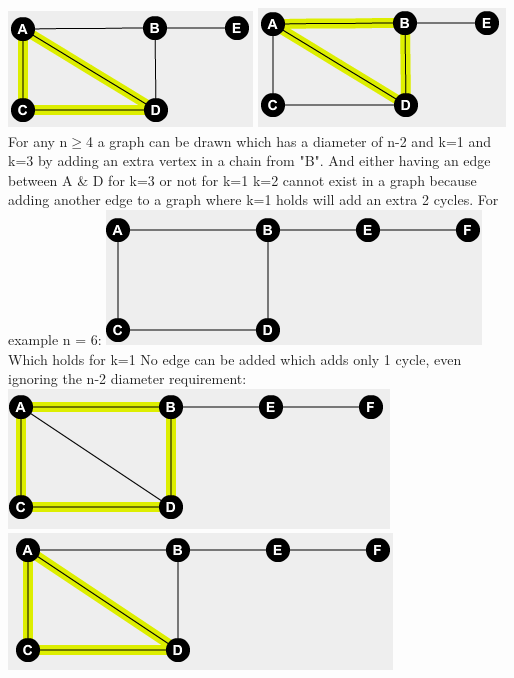 \documentclass{article}
\begin{document}
	\includegraphics{53Cycle2}
	\includegraphics{53Cycle3}
	\newline
	For any n$\geq$4 a graph can be drawn which has a diameter of n-2 and k=1 and k=3 by adding an extra vertex in a chain from "B".
	\newline
	And either having an edge between A \& D for k=3 or not for k=1
	\newline
	k=2 cannot exist in a graph because adding another edge to a graph where k=1 holds will add an extra 2 cycles.
	For example n = 6:
	\newline
	\includegraphics{6None}
	\newline
	Which holds for k=1
	\newline
	No edge can be added which adds only 1 cycle, even ignoring the n-2 diameter requirement:
	\newline
	\includegraphics{6Cycles1}
	\newline
	\includegraphics{6Cycles2}
\end{document}
